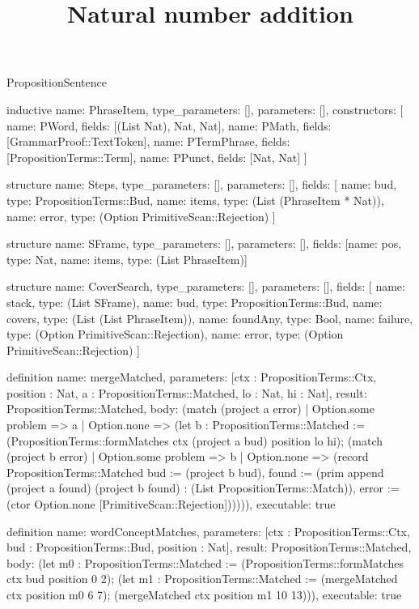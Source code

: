 \begin{lexlean}{PropositionSentence}
\title{Natural number addition}
\begin{semanticmodule}
inductive{
  name: PhraseItem,
  type_parameters: [],
  parameters: [],
  constructors: [
    {name: PWord, fields: [(List Nat), Nat, Nat]},
    {name: PMath, fields: [GrammarProof::TextToken]},
    {name: PTermPhrase, fields: [PropositionTerms::Term]},
    {name: PPunct, fields: [Nat, Nat]}
  ]
}

structure{
  name: Steps,
  type_parameters: [],
  parameters: [],
  fields: [
    {name: bud, type: PropositionTerms::Bud},
    {name: items, type: (List (PhraseItem * Nat))},
    {name: error, type: (Option PrimitiveScan::Rejection)}
  ]
}

structure{
  name: SFrame,
  type_parameters: [],
  parameters: [],
  fields: [{name: pos, type: Nat}, {name: items, type: (List PhraseItem)}]
}

structure{
  name: CoverSearch,
  type_parameters: [],
  parameters: [],
  fields: [
    {name: stack, type: (List SFrame)},
    {name: bud, type: PropositionTerms::Bud},
    {name: covers, type: (List (List PhraseItem))},
    {name: foundAny, type: Bool},
    {name: failure, type: (Option PrimitiveScan::Rejection)},
    {name: error, type: (Option PrimitiveScan::Rejection)}
  ]
}

definition{
  name: mergeMatched,
  parameters: [ctx : PropositionTerms::Ctx, position : Nat, a : PropositionTerms::Matched, lo : Nat, hi : Nat],
  result: PropositionTerms::Matched,
  body: (match (project a error)
    | Option.some problem => a
    | Option.none => (let b : PropositionTerms::Matched := (PropositionTerms::formMatches ctx (project a bud) position lo hi); (match (project b error)
      | Option.some problem => b
      | Option.none => (record PropositionTerms::Matched {bud := (project b bud), found := (prim append (project a found) (project b found) : (List PropositionTerms::Match)), error := (ctor Option.none [PrimitiveScan::Rejection])})))),
  executable: true
}

definition{
  name: wordConceptMatches,
  parameters: [ctx : PropositionTerms::Ctx, bud : PropositionTerms::Bud, position : Nat],
  result: PropositionTerms::Matched,
  body: (let m0 : PropositionTerms::Matched := (PropositionTerms::formMatches ctx bud position 0 2); (let m1 : PropositionTerms::Matched := (mergeMatched ctx position m0 6 7); (mergeMatched ctx position m1 10 13))),
  executable: true
}


\end{semanticmodule}
\end{lexlean}
